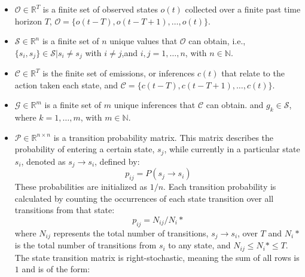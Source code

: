 \documentclass[letterpaper, 10 pt, conference]{ieeeconf}  %
\newcommand\NB[1]{$\spadesuit$\footnote{NB: #1}}
\begin{document}
\begin{itemize}
    \item $\mathcal{O}\in\mathbb{R}^T$ is a finite set of observed states $o(t)$ collected over a finite past time horizon $T$, $\mathcal{O} = \{ o(t-T), o(t-T+1), \ldots, o(t)\}$. 
    \item  $\mathcal{S}\in\mathbb{R}^n$ is a finite set of $n$ unique values that $\mathcal{O}$ can obtain, i.e., $\{s_i,s_j\} \in \mathcal{S} \vert s_i \neq s_j$ with $i\neq j$,and $i,j = 1,\ldots,n$, with $n \in \mathbb{N}$.
    \item $\mathcal{C}\in\mathbb{R}^T$ %
    is the finite set of emissions, or inferences $c(t)$ that relate to the action taken each state, and $\mathcal{C} = \{ c(t-T), c(t-T+1), \ldots, c(t)\}$. %
    \item $\mathcal{G}\in\mathbb{R}^m$ is a finite set of $m$ unique inferences that $\mathcal{C}$ can obtain. and $g_k \in \mathcal{S}$, where $k = 1,\ldots,m$, with $m \in \mathbb{N}$. 
    \item $\mathcal{P}\in\mathbb{R}^{n\times n}$ is a transition probability matrix. This matrix describes the probability of entering a certain state, $s_{j}$, while currently in a particular state $s_{i}$, denoted as $s_j \to s_i$, defined by:
        \begin{equation}
            p_{ij} = P(s_j\to s_i)
        \end{equation}
        These probabilities are initialized as $1/n$. Each transition probability is calculated by counting the occurrences of each state transition over all transitions from that state:
        \begin{equation} \label{eq:transbuild}
            p_{ij} = N_{ij}/N_{i}*
        \end{equation}
        where $N_{ij}$ represents the total number of transitions, $s_j \to s_i$, over $T$ and $N_{i}*$ is the total number of transitions from $s_i$ to any state, and $N_{ij} \leq N_{i}* \leq T$. The state transition matrix is right-stochastic, meaning the sum of all rows is $1$ and is of the form:

\end{itemize}
\end{document}
